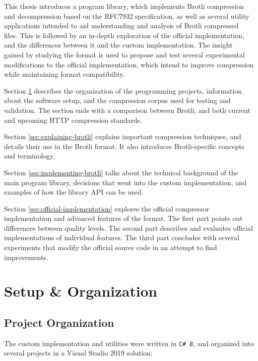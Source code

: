\documentclass[english,master,dept460,male,cpp,cpdeclaration]{diploma}
\newif\ifSIMPLIFIED
\begin{document}
\else %

This thesis introduces a program library, which implements Brotli compression and decompression based on the RFC7932\cite{RFC7932} specification, as well as several utility applications intended to aid understanding and analysis of Brotli compressed files. This is followed by an in-depth exploration of the official implementation, and the differences between it and the custom implementation. The insight gained by studying the format is used to propose and test several experimental modifications to the official implementation, which intend to improve compression while maintaining format compatibility.

Section \ref{sec:setup-and-organization} describes the organization of the programming projects, information about the software setup, and the compression corpus used for testing and validation. The section ends with a comparison between Brotli, and both current and upcoming HTTP compression standards.

Section \ref{sec:explaining-brotli} explains important compression techniques, and details their use in the Brotli format. It also introduces Brotli-specific concepts and terminology.

Section \ref{sec:implementing-brotli} talks about the technical background of the main program library, decisions that went into the custom implementation, and examples of how the library API can be used.

Section \ref{sec:official-implementation} explores the official compressor implementation and advanced features of the format. The first part points out differences between quality levels. The second part describes and evaluates official implementations of individual features. The third part concludes with several experiments that modify the official source code in an attempt to find improvements.

\fi %

\section{Setup \& Organization}
\label{sec:setup-and-organization}
	
	\ifSIMPLIFIED\else
	
	\subsection{Project Organization}
	
	The custom implementation and utilities were written in \verb|C# 8|, and organized into several projects in a Visual Studio 2019 solution:
	
\end{document}
